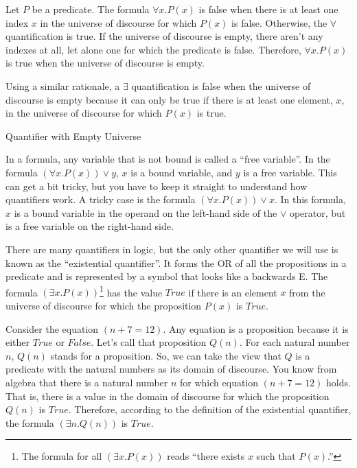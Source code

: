 {\begin{aside}
Let $P$ be a predicate.
The formula $\forall x.P(x)$ is false when there is
at least one index $x$ in the universe of discourse
for which $P(x)$ is false.
Otherwise, the $\forall$ quantification is true.
If the universe of discourse is empty,
there aren't any indexes at all,
let alone one for which the predicate is false.
Therefore, $\forall x.P(x)$ is true
when the universe of discourse is empty.

Using a similar rationale, a $\exists$ 
quantification
is false when the universe of discourse is empty
because it can only be true if there is
at least one element, $x$, in the universe of discourse
for which $P(x)$ is true.
\caption{Quantifier with Empty Universe}
\label{empty-forall}
\end{aside}

In a formula, any variable that is not bound is
called a
\label{def:free-variable}
``free variable''.
In the formula $(\forall x.P(x)) \vee y$,
$x$ is a bound variable, and $y$ is a free variable.
This can get a bit tricky, but you have to keep it
straight to understand how quantifiers work.
A tricky case is the formula
$(\forall x.P(x)) \vee x$.
In this formula, $x$ is a bound variable in the
operand on the left-hand side of the $\vee$ operator,
but is a free variable on the right-hand side.

There are many quantifiers in logic, but the only other
quantifier we will use is known as the
\label{def:existential-quantifier}
``existential quantifier''.
It forms the OR of all the propositions in a predicate
and is represented by a symbol that looks like a backwards E.
The  formula $(\exists x.P(x))$\footnote{The
formula for all $(\exists x.P(x))$ reads
``there exists $x$ such that $P(x)$.''}
has the value $True$
if there is an element $x$ from the universe of discourse
for which the proposition $P(x)$ is $True$.

Consider the equation $(n + 7 = 12)$.
Any equation is a proposition because it is either
$True$ or $False$. Let's call that proposition $Q(n)$.
For each natural number $n$,
$Q(n)$ stands for a proposition.
So, we can take the view that $Q$ is a predicate
with the natural numbers as its domain of discourse.
You know from algebra that there is a natural number
$n$ for which equation $(n + 7 = 12)$ holds.
That is, there is a value in the domain
of discourse for which the proposition $Q(n)$ is $True$.
Therefore, according to the definition of the
existential quantifier,
the formula $(\exists n.Q(n))$ is $True$.

}
